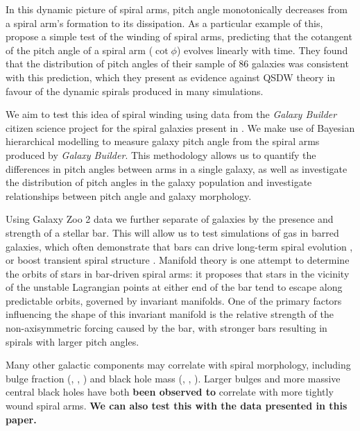 In this dynamic picture of spiral arms, pitch angle monotonically decreases from a spiral arm's formation to its dissipation. As a particular example of this, \citet{2019arXiv190910291P} propose a simple test of the winding of spiral arms, predicting that the cotangent of the pitch angle of a spiral arm ($\cot \phi$) evolves linearly with time. They found that the distribution of pitch angles of their sample of 86 galaxies was consistent with this prediction, which they present as evidence against QSDW theory in favour of the dynamic spirals produced in many simulations.

We aim to test this idea of spiral winding using data from the \textit{Galaxy Builder} citizen science project for the spiral galaxies present in \citet{2020arXiv200610450L}. We make use of Bayesian hierarchical modelling to measure galaxy pitch angle from the spiral arms produced by \textit{Galaxy Builder}. This methodology allows us to quantify the differences in pitch angles between arms in a single galaxy, as well as investigate the distribution of pitch angles in the galaxy population and investigate relationships between pitch angle and galaxy morphology.

Using Galaxy Zoo 2 data \citep{Willett2013:1308.3496v2} we further separate of galaxies by the presence and strength of a stellar bar. This will allow us to test simulations of gas in barred galaxies, which often demonstrate that bars can drive long-term spiral evolution \citep{2008A&A...489..115R}, or boost transient spiral structure \citep{2012MNRAS.426..167G}. Manifold theory \citep{2006A&A...453...39R,2009MNRAS.394...67A,2009MNRAS.400.1706A} is one attempt to determine the orbits of stars in bar-driven spiral arms: it proposes that stars in the vicinity of the unstable Lagrangian points at either end of the bar tend to escape along predictable orbits, governed by invariant manifolds. One of the primary factors influencing the shape of this invariant manifold is the relative strength of the non-axisymmetric forcing caused by the bar, with stronger bars resulting in spirals with larger pitch angles.

Many other galactic components may correlate with spiral morphology, including bulge fraction (\citealt{1975A&A....44..363Y}, \citealt{2013MNRAS.436.1074S}, \citealt{2019MNRAS.487.1808M}) and black hole mass (\citealt{2008ApJ...678L..93S}, \citealt{2017MNRAS.471.2187D}, \citealt{2019MS&E..571a2118A}). Larger bulges and more massive central black holes have both \textbf{been observed to} correlate with more tightly wound spiral arms. \textbf{We can also test this with the data presented in this paper.}

